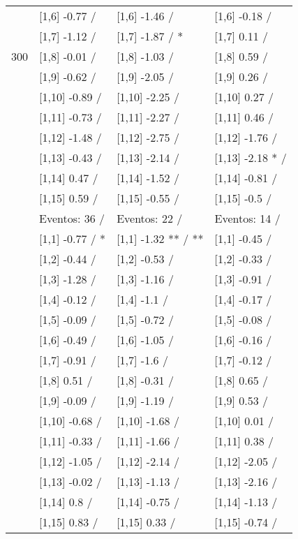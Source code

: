 \begin{table}
\begin{tabular}[t]{llll}
 & {}[1,6] -0.77  / & {}[1,6] -1.46  / & {}[1,6] -0.18  /\\
 & {}[1,7] -1.12  / & {}[1,7] -1.87  / * & {}[1,7] 0.11  /\\
300 & {}[1,8] -0.01  / & {}[1,8] -1.03  / & {}[1,8] 0.59  /\\
\addlinespace
 & {}[1,9] -0.62  / & {}[1,9] -2.05  / & {}[1,9] 0.26  /\\
 & {}[1,10] -0.89  / & {}[1,10] -2.25  / & {}[1,10] 0.27  /\\
 & {}[1,11] -0.73  / & {}[1,11] -2.27  / & {}[1,11] 0.46  /\\
 & {}[1,12] -1.48  / & {}[1,12] -2.75  / & {}[1,12] -1.76  /\\
 & {}[1,13] -0.43  / & {}[1,13] -2.14  / & {}[1,13] -2.18 * /\\
\addlinespace
 & {}[1,14] 0.47  / & {}[1,14] -1.52  / & {}[1,14] -0.81  /\\
 & {}[1,15] 0.59  / & {}[1,15] -0.55  / & {}[1,15] -0.5  /\\
 & Eventos:  36 / & Eventos:  22 / & Eventos:  14 /\\
 & {}[1,1] -0.77  / * & {}[1,1] -1.32 ** / ** & {}[1,1] -0.45  /\\
 & {}[1,2] -0.44  / & {}[1,2] -0.53  / & {}[1,2] -0.33  /\\
\addlinespace
 & {}[1,3] -1.28  / & {}[1,3] -1.16  / & {}[1,3] -0.91  /\\
 & {}[1,4] -0.12  / & {}[1,4] -1.1  / & {}[1,4] -0.17  /\\
 & {}[1,5] -0.09  / & {}[1,5] -0.72  / & {}[1,5] -0.08  /\\
 & {}[1,6] -0.49  / & {}[1,6] -1.05  / & {}[1,6] -0.16  /\\
 & {}[1,7] -0.91  / & {}[1,7] -1.6  / & {}[1,7] -0.12  /\\
\addlinespace
500 & {}[1,8] 0.51  / & {}[1,8] -0.31  / & {}[1,8] 0.65  /\\
 & {}[1,9] -0.09  / & {}[1,9] -1.19  / & {}[1,9] 0.53  /\\
 & {}[1,10] -0.68  / & {}[1,10] -1.68  / & {}[1,10] 0.01  /\\
 & {}[1,11] -0.33  / & {}[1,11] -1.66  / & {}[1,11] 0.38  /\\
 & {}[1,12] -1.05  / & {}[1,12] -2.14  / & {}[1,12] -2.05  /\\
\addlinespace
 & {}[1,13] -0.02  / & {}[1,13] -1.13  / & {}[1,13] -2.16  /\\
 & {}[1,14] 0.8  / & {}[1,14] -0.75  / & {}[1,14] -1.13  /\\
 & {}[1,15] 0.83  / & {}[1,15] 0.33  / & {}[1,15] -0.74  /\\
\bottomrule
\end{tabular}
\end{table}
